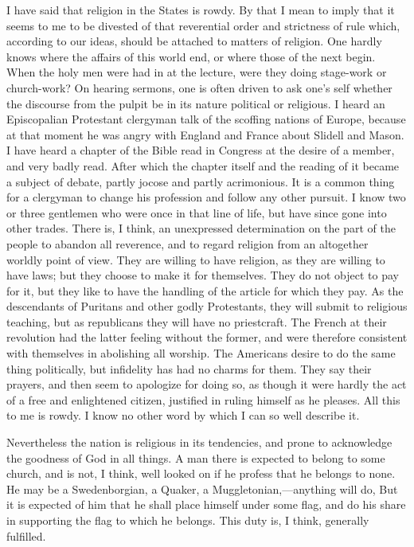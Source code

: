 I have said that religion in the States is rowdy.  By that I mean
to imply that it seems to me to be divested of that reverential
order and strictness of rule which, according to our ideas, should
be attached to matters of religion.  One hardly knows where the
affairs of this world end, or where those of the next begin.  When
the holy men were had in at the lecture, were they doing stage-work
or church-work?  On hearing sermons, one is often driven to ask
one's self whether the discourse from the pulpit be in its nature
political or religious.  I heard an Episcopalian Protestant
clergyman talk of the scoffing nations of Europe, because at that
moment he was angry with England and France about Slidell and
Mason.  I have heard a chapter of the Bible read in Congress at the
desire of a member, and very badly read.  After which the chapter
itself and the reading of it became a subject of debate, partly
jocose and partly acrimonious.  It is a common thing for a
clergyman to change his profession and follow any other pursuit.  I
know two or three gentlemen who were once in that line of life, but
have since gone into other trades.  There is, I think, an
unexpressed determination on the part of the people to abandon all
reverence, and to regard religion from an altogether worldly point
of view.  They are willing to have religion, as they are willing to
have laws; but they choose to make it for themselves.  They do not
object to pay for it, but they like to have the handling of the
article for which they pay.  As the descendants of Puritans and
other godly Protestants, they will submit to religious teaching,
but as republicans they will have no priestcraft.  The French at
their revolution had the latter feeling without the former, and
were therefore consistent with themselves in abolishing all
worship.  The Americans desire to do the same thing politically,
but infidelity has had no charms for them.  They say their prayers,
and then seem to apologize for doing so, as though it were hardly
the act of a free and enlightened citizen, justified in ruling
himself as he pleases.  All this to me is rowdy.  I know no other
word by which I can so well describe it.

Nevertheless the nation is religious in its tendencies, and prone
to acknowledge the goodness of God in all things.  A man there is
expected to belong to some church, and is not, I think, well looked
on if he profess that he belongs to none.  He may be a
Swedenborgian, a Quaker, a Muggletonian,---anything will do, But it
is expected of him that he shall place himself under some flag, and
do his share in supporting the flag to which he belongs.  This duty
is, I think, generally fulfilled.




